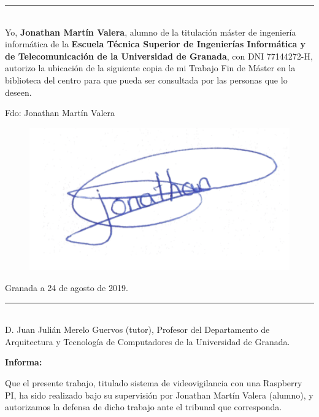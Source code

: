 \thispagestyle{empty}


\noindent\rule[-1ex]{\textwidth}{2pt}\\[4.5ex]

Yo, \textbf{Jonathan Martín Valera}, alumno de la titulación máster de ingeniería informática de la \textbf{Escuela Técnica Superior de Ingenierías Informática y de Telecomunicación de la Universidad de Granada}, con DNI 77144272-H, autorizo la ubicación de la siguiente copia de mi Trabajo Fin de Máster en la biblioteca del centro para que pueda ser consultada por las personas que lo deseen.

\vspace{0.5cm}

\noindent Fdo: Jonathan Martín Valera

\begin{figure}[h]
	\centering
	\includegraphics[scale=0.3]{images/firma}
\end{figure}

\begin{flushright}
Granada a 24 de agosto de 2019.
\end{flushright}


\newpage

\thispagestyle{empty}

\noindent\rule[-1ex]{\textwidth}{2pt}\\[4.5ex]

D. Juan Julián Merelo Guervos (tutor), Profesor del Departamento de Arquitectura y Tecnología de Computadores de la Universidad de Granada.

\textbf{Informa:}

Que el presente trabajo, titulado sistema de videovigilancia con una Raspberry PI, ha sido realizado bajo su supervisión por Jonathan Martín Valera (alumno), y autorizamos la defensa de dicho trabajo ante el tribunal que corresponda.

